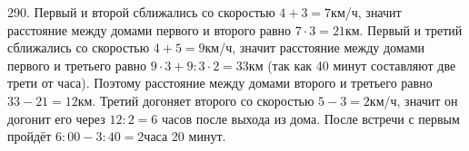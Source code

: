 290. Первый и второй сближались со скоростью $4+3=7$км/ч, значит расстояние между домами первого и второго равно $7\cdot3=21$км. Первый и третий сближались со скоростью $4+5=9$км/ч, значит расстояние между домами первого и третьего равно $9\cdot3+9:3\cdot2=33$км (так как 40 минут составляют две трети от часа). Поэтому расстояние между домами второго и третьего равно $33-21=12$км. Третий догоняет второго со скоростью $5-3=2$км/ч, значит он догонит его через $12:2=6$ часов после выхода из дома. После встречи с первым пройдёт $6:00-3:40=2$часа 20 минут.\\
